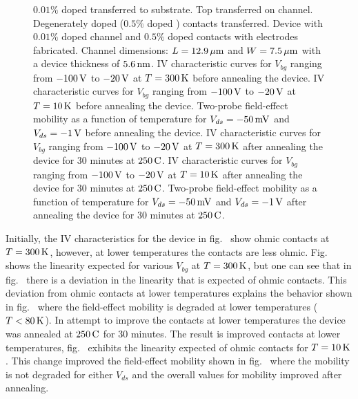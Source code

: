 \begin{figure}[ht]
	\caption[Degenerately doped contacts and lightly doped channel field-effect mobility]{\protect{} $0.01\%$  doped  transferred to \hbn substrate. \protect{} Top \hbn transferred on  channel. \protect{} Degenerately doped ($0.5\%$  doped ) contacts transferred. \protect{} Device with $0.01\%$  doped  channel and $0.5\%$  doped  contacts with electrodes fabricated. Channel dimensions: $L = 12.9\,\mathrm{\mu m}$ and $W = 7.5\,\mathrm{\mu m}$ with a device thickness of $5.6\,\mathrm{nm}$. \protect{} IV characteristic curves for $V_{bg}$ ranging from $-100\,\mathrm{V}$ to $-20\,\mathrm{V}$ at $T=300\,\mathrm{K}$ before annealing the device. \protect{} IV characteristic curves for $V_{bg}$ ranging from $-100\,\mathrm{V}$ to $-20\,\mathrm{V}$ at $T=10\,\mathrm{K}$ before annealing the device. \protect{} Two-probe field-effect mobility as a function of temperature for $V_{ds}=-50\,\mathrm{mV}$ and $V_{ds}=-1\,\mathrm{V}$ before annealing the device. \protect{} IV characteristic curves for $V_{bg}$ ranging from $-100\,\mathrm{V}$ to $-20\,\mathrm{V}$ at $T=300\,\mathrm{K}$ after annealing the device for 30 minutes at $250\,\mathrm{C}$. \protect{} IV characteristic curves for $V_{bg}$ ranging from $-100\,\mathrm{V}$ to $-20\,\mathrm{V}$ at $T=10\,\mathrm{K}$ after annealing the device for 30 minutes at $250\,\mathrm{C}$. \protect{} Two-probe field-effect mobility as a function of temperature for $V_{ds}=-50\,\mathrm{mV}$ and $V_{ds}=-1\,\mathrm{V}$ after annealing the device for 30 minutes at $250\,\mathrm{C}$.}
	\label{fig:two_probe_mu_fe_data}
\end{figure}
\noindent Initially, the IV characteristics for the device in fig.~ show ohmic contacts at $T=300\,\mathrm{K}$, however, at lower temperatures the contacts are less ohmic. Fig.~ shows the linearity expected for various $V_{bg}$ at $T=300\,\mathrm{K}$, but one can see that in fig.~ there is a deviation in the linearity that is expected of ohmic contacts. This deviation from ohmic contacts at lower temperatures explains the behavior shown in fig.~ where the field-effect mobility is degraded at lower temperatures ($T<80\,\mathrm{K}$). In attempt to improve the contacts at lower temperatures the device was annealed at $250\,\mathrm{C}$ for 30 minutes. The result is improved contacts at lower temperatures, fig.~ exhibits the linearity expected of ohmic contacts for $T=10\,\mathrm{K}$. This change improved the field-effect mobility shown in fig.~ where the mobility is not degraded for either $V_{ds}$ and the overall values for mobility improved after annealing.